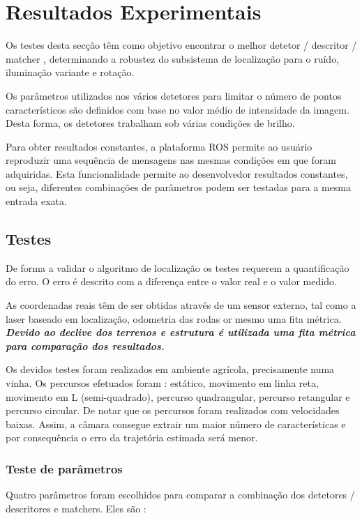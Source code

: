 \chapter{Resultados Experimentais} \label{chap:resexp}


Os testes desta secção têm como objetivo encontrar o melhor detetor / descritor / matcher , determinando a robustez do subsistema de localização para o ruído, iluminação variante e rotação.

Os parâmetros utilizados nos vários detetores para limitar o número de pontos característicos são definidos com base no valor médio de intensidade da imagem. Desta forma, os detetores trabalham sob várias condições de brilho.

Para obter resultados constantes, a plataforma ROS permite ao usuário reproduzir uma sequência de mensagens nas mesmas condições em que foram adquiridas. Esta funcionalidade permite ao desenvolvedor resultados constantes, ou seja, diferentes combinações de parâmetros podem ser testadas para a mesma entrada exata.

\section{Testes}

De forma a validar o algoritmo de localização os testes requerem a quantificação do erro. O erro é descrito com a diferença entre o valor real e o valor medido.

As coordenadas reais têm de ser obtidas através de um sensor externo, tal como a laser baseado em localização, odometria das rodas or mesmo uma fita métrica. \textbf{\textit{Devido ao declive dos terrenos e estrutura é utilizada uma fita métrica para comparação dos resultados.}}

Os devidos testes foram realizados em ambiente agrícola, precisamente numa vinha. Os percursos efetuados foram : estático, movimento em linha reta, movimento em L (semi-quadrado), percurso quadrangular, percurso retangular e percurso circular. De notar que os percursos foram realizados com velocidades baixas. Assim, a câmara consegue extrair um maior número de características e por consequência o erro da trajetória estimada será menor.  


\subsection{Teste de parâmetros}

Quatro parâmetros foram escolhidos para comparar a combinação dos detetores / descritores e matchers. Eles são :

